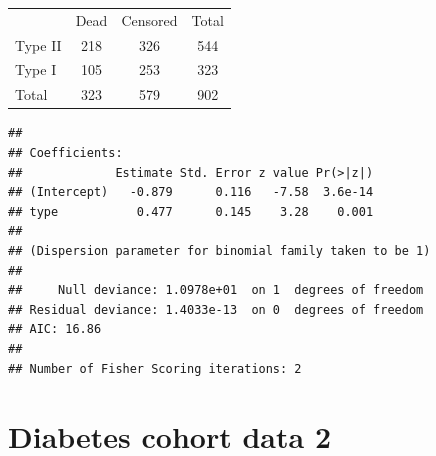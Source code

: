 \documentclass[10pt,handout]{beamer}\usepackage[]{graphicx}\usepackage[]{color}
\makeatletter
\newenvironment{kframe}{%
 \def\at@end@of@kframe{}%
 \ifinner\ifhmode%
  \def\at@end@of@kframe{\end{minipage}}%
  \begin{minipage}{\columnwidth}%
 \fi\fi%
 \def\FrameCommand##1{\hskip\@totalleftmargin \hskip-\fboxsep
 \colorbox{shadecolor}{##1}\hskip-\fboxsep
     \hskip-\linewidth \hskip-\@totalleftmargin \hskip\columnwidth}%
 \MakeFramed {\advance\hsize-\width
   \@totalleftmargin\z@ \linewidth\hsize
   \@setminipage}}%
 {\par\unskip\endMakeFramed%
 \at@end@of@kframe}
\newenvironment{knitrout}{}{} %
\makeatother
\begin{document}
\begin{frame}
	\vspace{-1.31in}
	\tiny
\begin{table}[h]
	\centering
	\begin{tabular}{lcc|c}
		& Dead &  Censored & Total\\
		Type II & 218 & 326 & 544 \\
		Type I & 105 & 253 & 323 \\
		\hline
		Total & 323 & 579 & 902
	\end{tabular}
\end{table}

	\vspace{-.21in}
\begin{knitrout}\tiny
{}\color{fgcolor}\begin{kframe}
\begin{verbatim}
## 
## Coefficients:
##             Estimate Std. Error z value Pr(>|z|)
## (Intercept)   -0.879      0.116   -7.58  3.6e-14
## type           0.477      0.145    3.28    0.001
## 
## (Dispersion parameter for binomial family taken to be 1)
## 
##     Null deviance: 1.0978e+01  on 1  degrees of freedom
## Residual deviance: 1.4033e-13  on 0  degrees of freedom
## AIC: 16.86
## 
## Number of Fisher Scoring iterations: 2
\end{verbatim}
\end{kframe}
\end{knitrout}
\end{frame}


\section{Diabetes cohort data 2}
\end{document}
